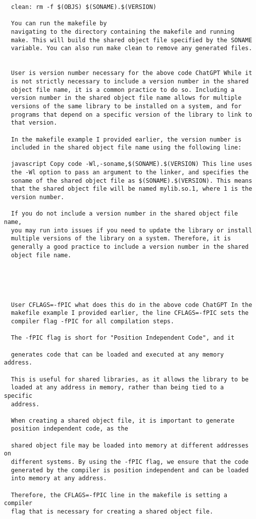 \documentclass{article}
\begin{document}
\begin{Verbatim}
  clean: rm -f $(OBJS) $(SONAME).$(VERSION)

  You can run the makefile by
  navigating to the directory containing the makefile and running
  make. This will build the shared object file specified by the SONAME
  variable. You can also run make clean to remove any generated files.


  User is version number necessary for the above code ChatGPT While it
  is not strictly necessary to include a version number in the shared
  object file name, it is a common practice to do so. Including a
  version number in the shared object file name allows for multiple
  versions of the same library to be installed on a system, and for
  programs that depend on a specific version of the library to link to
  that version.

  In the makefile example I provided earlier, the version number is
  included in the shared object file name using the following line:

  javascript Copy code -Wl,-soname,$(SONAME).$(VERSION) This line uses
  the -Wl option to pass an argument to the linker, and specifies the
  soname of the shared object file as $(SONAME).$(VERSION). This means
  that the shared object file will be named mylib.so.1, where 1 is the
  version number.

  If you do not include a version number in the shared object file name,
  you may run into issues if you need to update the library or install
  multiple versions of the library on a system. Therefore, it is
  generally a good practice to include a version number in the shared
  object file name.





  User CFLAGS=-fPIC what does this do in the above code ChatGPT In the
  makefile example I provided earlier, the line CFLAGS=-fPIC sets the
  compiler flag -fPIC for all compilation steps.

  The -fPIC flag is short for "Position Independent Code", and it
  
  generates code that can be loaded and executed at any memory address.
  
  This is useful for shared libraries, as it allows the library to be
  loaded at any address in memory, rather than being tied to a specific
  address.

  When creating a shared object file, it is important to generate
  position independent code, as the
  
  shared object file may be loaded into memory at different addresses on
  different systems. By using the -fPIC flag, we ensure that the code
  generated by the compiler is position independent and can be loaded
  into memory at any address.

  Therefore, the CFLAGS=-fPIC line in the makefile is setting a compiler
  flag that is necessary for creating a shared object file.
\end{Verbatim}
\end{document}
